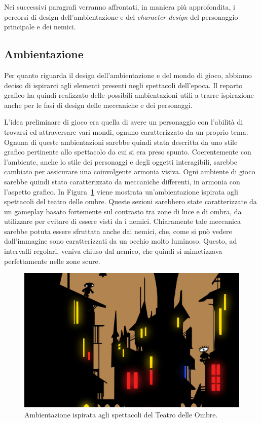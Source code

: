 Nei successivi paragrafi verranno affrontati, in maniera più approfondita, i percorsi di design dell’ambientazione e del \textit{character design} del personaggio principale e dei nemici.

\subsection{Ambientazione}
\label{sec:ambientazione}

Per quanto riguarda il design dell’ambientazione e del mondo di gioco, abbiamo deciso di ispirarci agli elementi presenti negli spettacoli dell’epoca. Il reparto grafico ha quindi realizzato delle possibili ambientazioni utili a trarre ispirazione anche per le fasi di design delle meccaniche e dei personaggi.

L’idea preliminare di gioco era quella di avere un personaggio con l’abilità di trovarsi ed attraversare vari mondi, ognuno caratterizzato da un proprio tema. Ognuna di queste ambientazioni sarebbe quindi stata descritta da uno stile grafico pertinente allo spettacolo da cui si era preso spunto. Coerentemente con l’ambiente, anche lo stile dei personaggi e degli oggetti interagibili, sarebbe cambiato per assicurare una coinvolgente armonia visiva. Ogni ambiente di gioco sarebbe quindi stato caratterizzato da meccaniche differenti, in armonia con l’aspetto grafico.
In Figura~\ref{fig:ambientazione_teatro_ombre} viene mostrata un'ambientazione ispirata agli spettacoli del teatro delle ombre. Queste sezioni sarebbero state caratterizzate da un gameplay basato fortemente sul contrasto tra zone di luce e di ombra, da utilizzare per evitare di essere visti da i nemici. Chiaramente tale meccanica sarebbe potuta essere sfruttata anche dai nemici, che, come si può vedere dall’immagine sono caratterizzati da un occhio molto luminoso. Questo, ad intervalli regolari, veniva chiuso dal nemico, che quindi si mimetizzava perfettamente nelle zone scure.

\begin{figure}%
	\centering
	\includegraphics[width= 0.9\columnwidth]{images/gameDesign/28_cinefuochi.jpg}
	\caption{Ambientazione ispirata agli spettacoli del Teatro delle Ombre.}
	\label{fig:ambientazione_teatro_ombre}
\end{figure} 

